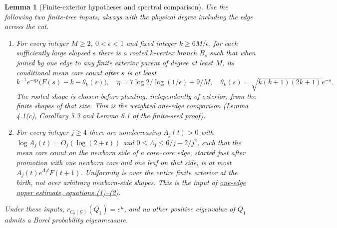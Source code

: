 \documentclass[11pt]{article}
\newcommand{\proofsrc}[2]{\href{https://github.com/uzay-eth/friend-tree-exponent/blob/a0972085ad72ad5685ae7b424988648d1965e73c/#1}{#2}}
\newtheorem{lemma}{Lemma}[section]
\theoremstyle{remark}
\numberwithin{equation}{section}
\begin{document}
\begin{lemma}[Finite-exterior hypotheses and spectral comparison]\label{lem:core-ports}
Use the following two finite-tree inputs, always with the physical degree including the edge across the cut.
\begin{enumerate}
\item For every integer $M\ge2$, $0<\epsilon<1$ and fixed integer $k\ge6M/\epsilon$, for each sufficiently large elapsed $s$ there is a rooted $k$-vertex branch $B_s$ such that when joined by one edge to any finite exterior parent of degree at least $M$, its conditional mean core count after $s$ is at least
\[
 k^{-1}e^{-\eta s}\big(F(s)-k-\theta_k(s)\big),\quad
 \eta=7\log 2/\log(1/\epsilon)+9/M,\quad
 \theta_k(s)=\sqrt{k(k+1)(2k+1)}e^{-s}.
\]
The rooted shape is chosen before planting, independently of exterior, from the finite shapes of that size. This is the weighted one-edge comparison (Lemma 4.1(c), Corollary 5.3 and Lemma 6.1 of \proofsrc{proofs/existence.md}{the finite-seed proof}).
\item For every integer $j\ge4$ there are nondecreasing $A_j(t)>0$ with $\log A_j(t)=O_j(\log(2+t))$ and $0\le\Lambda_j\le6/j+2/j^2$, such that the mean core count on the newborn side of a core--core edge, started just after promotion with one newborn core and one leaf on that side, is at most $A_j(t)e^{\Lambda_jt}F(t+1)$. Uniformity is over the entire finite exterior at the birth, not over arbitrary newborn-side shapes. This is the input of \proofsrc{round2/proofs/astra/source/round2/finite/one-port-upper.md}{one-edge upper estimate, equations (1)--(2)}.
\end{enumerate}
Under these inputs, $r_{C_b(\mathcal G)}(Q_1)=e^\mu$, and no other positive eigenvalue of $Q_1$ admits a Borel probability eigenmeasure.
\end{lemma}
\end{document}
